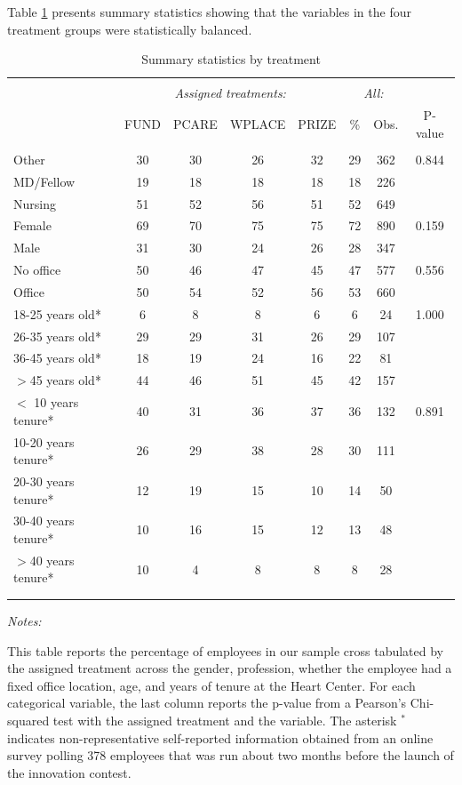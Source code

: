 \documentclass[12pt, titlepage]{article}
\newenvironment{tablenotes}[1][]{
  \begin{minipage}{\textwidth}\emph{Notes:}{\footnotesize #1}
}{\end{minipage}}
\begin{document}
Table \ref{summary-statistics} presents summary statistics showing that
the variables in the four treatment groups were statistically balanced.

\begin{table}
\centering
\caption{Summary statistics by treatment}
\label{summary-statistics}
\begin{tabular}{@{}lccccccc}
  \\[-1.8ex]\hline \hline \\[-1.8ex]
 & \multicolumn{4}{c}{\emph{Assigned treatments:}} & \multicolumn{2}{c}{\emph{All:}} \\
\cmidrule(lr){2-5}\cmidrule(lr){6-7} & FUND & PCARE & WPLACE & PRIZE & \% & Obs. & P-value \\ 
  \hline \\[-1.86ex]
Other & 30 & 30 & 26 & 32 & 29 & 362 & 0.844 \\ 
  MD/Fellow & 19 & 18 & 18 & 18 & 18 & 226 &  \\ 
  Nursing & 51 & 52 & 56 & 51 & 52 & 649 &  \\ 
  [1.86ex] Female & 69 & 70 & 75 & 75 & 72 & 890 & 0.159 \\ 
  Male & 31 & 30 & 24 & 26 & 28 & 347 &  \\ 
  [1.86ex] No office & 50 & 46 & 47 & 45 & 47 & 577 & 0.556 \\ 
  Office & 50 & 54 & 52 & 56 & 53 & 660 &  \\ 
  [1.86ex] 18-25 years old* & 6 & 8 & 8 & 6 & 6 & 24 & 1.000 \\ 
  26-35 years old* & 29 & 29 & 31 & 26 & 29 & 107 &  \\ 
  36-45 years old* & 18 & 19 & 24 & 16 & 22 & 81 &  \\ 
  $>$45 years old* & 44 & 46 & 51 & 45 & 42 & 157 &  \\ 
  [1.86ex] $<$ 10 years tenure* & 40 & 31 & 36 & 37 & 36 & 132 & 0.891 \\ 
  10-20 years tenure* & 26 & 29 & 38 & 28 & 30 & 111 &  \\ 
  20-30 years tenure* & 12 & 19 & 15 & 10 & 14 & 50 &  \\ 
  30-40 years tenure* & 10 & 16 & 15 & 12 & 13 & 48 &  \\ 
  $>$40 years tenure* & 10 & 4 & 8 & 8 & 8 & 28 &  \\ 
   \\[-1.8ex]\hline \hline \\[-1.8ex]
\end{tabular}
\begin{tablenotes}
This table reports the percentage of employees in our sample cross tabulated by the assigned treatment across the gender, profession, whether the employee had a fixed office location, age, and years of tenure at the Heart Center. For each categorical variable, the last column reports the p-value from a Pearson's Chi-squared test with the assigned treatment and the variable. The asterisk $^{\ast}$ indicates non-representative self-reported information obtained from an online survey polling 378 employees that was run about two months before the launch of the innovation contest.
\end{tablenotes}
\end{table}
\end{document}
